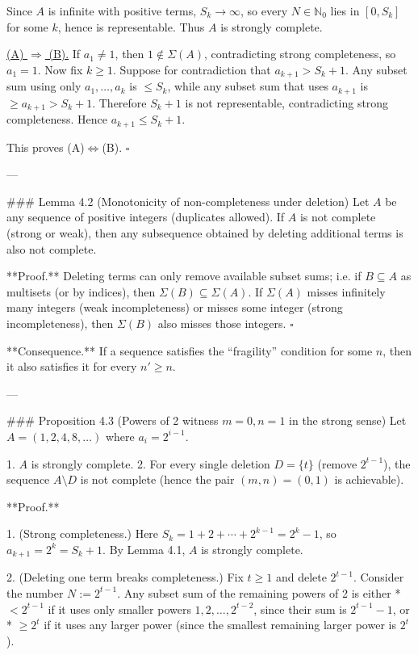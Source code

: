 Since \(A\) is infinite with positive terms, \(S_k\to\infty\), so every \(N\in\mathbb N_0\) lies in
\([0,S_k]\) for some \(k\), hence is representable. Thus \(A\) is strongly complete.

\underline{(A) \(\Rightarrow\) (B).}
If \(a_1\ne 1\), then \(1\notin\Sigma(A)\), contradicting strong completeness, so \(a_1=1\).
Now fix \(k\ge 1\). Suppose for contradiction that \(a_{k+1}>S_k+1\).
Any subset sum using only \(a_1,\dots,a_k\) is \(\le S_k\), while any subset sum that uses
\(a_{k+1}\) is \(\ge a_{k+1}>S_k+1\). Therefore \(S_k+1\) is not representable, contradicting
strong completeness. Hence \(a_{k+1}\le S_k+1\).

This proves (A)\(\Leftrightarrow\)(B). \(\square\)

---

### Lemma 4.2 (Monotonicity of non-completeness under deletion)
Let \(A\) be any sequence of positive integers (duplicates allowed). If \(A\) is not complete
(strong or weak), then any subsequence obtained by deleting additional terms is also not complete.

**Proof.** Deleting terms can only remove available subset sums; i.e. if \(B\subseteq A\) as
multisets (or by indices), then \(\Sigma(B)\subseteq\Sigma(A)\). If \(\Sigma(A)\) misses infinitely
many integers (weak incompleteness) or misses some integer (strong incompleteness), then
\(\Sigma(B)\) also misses those integers. \(\square\)

**Consequence.** If a sequence satisfies the “fragility” condition for some \(n\), then it also
satisfies it for every \(n'\ge n\).

---

### Proposition 4.3 (Powers of 2 witness \(m=0,n=1\) in the strong sense)
Let \(A=(1,2,4,8,\dots)\) where \(a_i=2^{i-1}\).

1. \(A\) is strongly complete.
2. For every single deletion \(D=\{t\}\) (remove \(2^{t-1}\)), the sequence \(A\setminus D\) is not
   complete (hence the pair \((m,n)=(0,1)\) is achievable).

**Proof.**

1. (Strong completeness.) Here \(S_k=1+2+\cdots+2^{k-1}=2^k-1\), so \(a_{k+1}=2^k=S_k+1\).
   By Lemma 4.1, \(A\) is strongly complete.

2. (Deleting one term breaks completeness.) Fix \(t\ge 1\) and delete \(2^{t-1}\). Consider the number
   \(N:=2^{t-1}\). Any subset sum of the remaining powers of 2 is either
   * \(<2^{t-1}\) if it uses only smaller powers \(1,2,\dots,2^{t-2}\), since their sum is
     \(2^{t-1}-1\), or
   * \(\ge 2^t\) if it uses any larger power (since the smallest remaining larger power is \(2^t\)).

